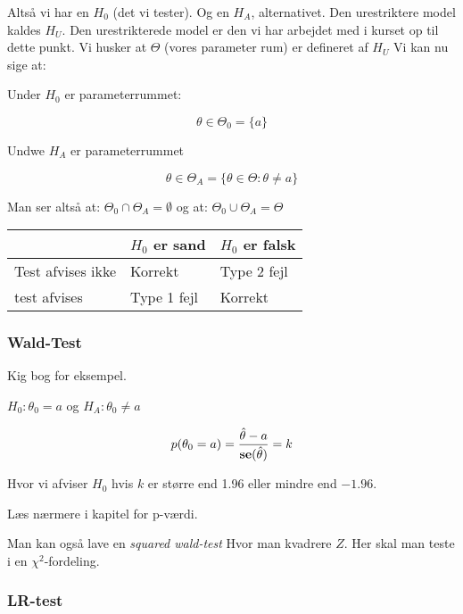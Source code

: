 Altså vi har en $H_0$ (det vi tester). Og en $H_A$, alternativet. Den urestriktere model kaldes $H_U$. Den urestrikterede model er den vi har arbejdet med i kurset op til dette punkt. Vi husker at $\Theta$ (vores parameter rum) er defineret af $H_U$ Vi kan nu sige at:

Under $H_0$ er parameterrummet:

\begin{equation}
    \theta \in \Theta_0 = \{a\}
\end{equation}

Undwe $H_A$ er parameterrummet

\begin{equation}
    \theta \in \Theta_A = \{\theta \in \Theta : \theta \neq a\}
\end{equation}

Man ser altså at: $\Theta_0 \cap \Theta_A = \emptyset$ og at: $\Theta_0 \cup \Theta_A = \Theta$


\begin{table}[ht]
\centering
\begin{tabular}{@{}lll@{}}
\toprule
                  & $H_0$ er sand & $H_0$ er falsk \\ \midrule
Test afvises ikke & Korrekt       & Type 2 fejl    \\
test afvises      & Type 1 fejl   & Korrekt        \\ \bottomrule
\end{tabular}
\end{table}


\subsubsection{Wald-Test}

Kig bog for eksempel.

$H_0 : \theta_0 = a$ og $H_A : \theta_0 \neq a$

\begin{equation}
    p(\theta_0 = a) = \frac{\hat{\theta} - a}{\textbf{se}(\hat{\theta})} = k
\end{equation}

Hvor vi afviser $H_0$ hvis $k$ er større end 1.96 eller mindre end $-1.96$.

Læs nærmere i kapitel for p-værdi.

Man kan også lave en \textit{squared wald-test} Hvor man kvadrere $Z$. Her skal man teste i en $\chi^2$-fordeling.

\subsubsection{LR-test}

